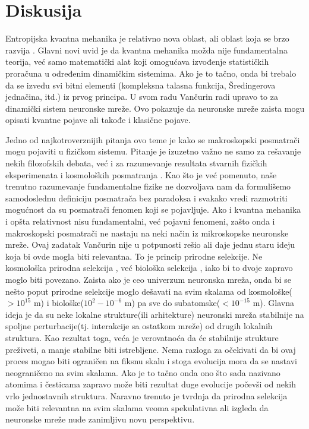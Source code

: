 \documentclass[a4paper]{article}
\begin{document}
\section{Diskusija}
Entropijska kvantna mehanika je relativno nova \cite{4} oblast, ali oblast koja se brzo razvija \cite{5}. Glavni novi uvid je da kvantna mehanika možda nije fundamentalna teorija, već samo matematički alat koji omogućava izvođenje statističkih proračuna u određenim dinamičkim sistemima. Ako je to tačno, onda bi trebalo da se izvedu svi bitni elementi (kompleksna talasna funkcija, Šredingerova jednačina, itd.) iz prvog principa. U svom radu Vančurin radi upravo to za dinamički sistem neuronske mreže. Ovo pokazuje da neuronske mreže zaista mogu opisati kvantne pojave ali takođe i klasične pojave. 

Jedno od najkotroverznijih pitanja ovo teme je kako se makroskopski posmatrači mogu pojaviti u fizičkom sistemu. Pitanje je izuzetno važno ne samo za rešavanje nekih filozofskih debata, već i za razumevanje rezultata stvarnih fizičkih eksperimenata \cite{8} i kosmoloških posmatranja \cite{9}. Kao što je već pomenuto, naše trenutno razumevanje fundamentalne fizike ne dozvoljava nam da formulišemo samodoslednu definiciju posmatrača bez paradoksa i svakako vredi razmotriti mogućnost da su posmatrači fenomen koji se pojavljuje. Ako i kvantna mehanika i opšta relativnost nisu fundamentalni, već pojavni fenomeni, zašto onda i makroskopski posmatrači ne nastaju na neki način iz mikroskopske neuronske mreže. Ovaj zadatak Vančurin nije u potpunosti rešio ali daje jednu staru ideju koja bi ovde mogla biti relevantna. To je princip prirodne selekcije. Ne kosmološka prirodna selekcija \cite{10}, već biološka selekcija \cite{11}, iako bi to dvoje zapravo moglo biti povezano. Zaista ako je ceo univerzum neuronska mreža, onda bi se nešto poput prirodne selekcije moglo dešavati na svim skalama od kosmološke($>10^{15}$ m) i biološke($10^{2}-10^{-6}$ m) pa sve do subatomske($<10^{-15}$ m). Glavna ideja je da su neke lokalne strukture(ili arhitekture) neuronski mreža stabilnije na spoljne perturbacije(tj. interakcije sa ostatkom mreže) od drugih lokalnih struktura. Kao rezultat toga, veća je verovatnoća da će stabilnije strukture preživeti, a manje stabilne biti istrebljene. Nema razloga za očekivati da bi ovaj proces mogao biti ograničen na fiksnu skalu i stoga evolucija mora da se nastavi neograničeno na svim skalama. Ako je to tačno onda ono što sada nazivano atomima i česticama zapravo može biti rezultat duge evolucije počevši od nekih vrlo jednostavnih struktura. Naravno trenuto je tvrdnja da prirodna selekcija može biti relevantna na svim skalama veoma spekulativna ali izgleda da neuronske mreže nude zanimljivu novu perspektivu.
\end{document}
